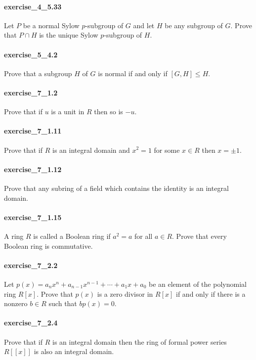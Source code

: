 \documentclass{article}
\begin{document}
\paragraph{exercise\_4\_5.33} Let $P$ be a normal Sylow $p$-subgroup of $G$ and let $H$ be any subgroup of $G$. Prove that $P \cap H$ is the unique Sylow $p$-subgroup of $H$.

\paragraph{exercise\_5\_4.2} Prove that a subgroup $H$ of $G$ is normal if and only if $[G, H] \leq H$.

\paragraph{exercise\_7\_1.2} Prove that if $u$ is a unit in $R$ then so is $-u$.

\paragraph{exercise\_7\_1.11} Prove that if $R$ is an integral domain and $x^{2}=1$ for some $x \in R$ then $x=\pm 1$.

\paragraph{exercise\_7\_1.12} Prove that any subring of a field which contains the identity is an integral domain.

\paragraph{exercise\_7\_1.15} A ring $R$ is called a Boolean ring if $a^{2}=a$ for all $a \in R$. Prove that every Boolean ring is commutative.

\paragraph{exercise\_7\_2.2} Let $p(x)=a_{n} x^{n}+a_{n-1} x^{n-1}+\cdots+a_{1} x+a_{0}$ be an element of the polynomial ring $R[x]$. Prove that $p(x)$ is a zero divisor in $R[x]$ if and only if there is a nonzero $b \in R$ such that $b p(x)=0$.

\paragraph{exercise\_7\_2.4} Prove that if $R$ is an integral domain then the ring of formal power series $R[[x]]$ is also an integral domain.
\end{document}

